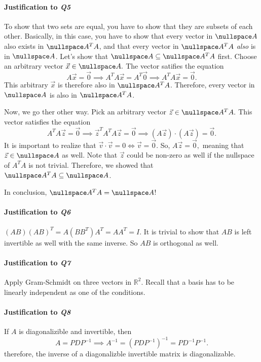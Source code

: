 	\paragraph{Justification to \textit{Q5}} To show that two sets are equal, you have to show that they are subsets of each other. Basically, in this case,
			you have to show that every vector in \(\nullspace A\) also exists in \(\nullspace A^TA\), and that every vector in \(\nullspace A^TA\) 
			\emph{also} is in \(\nullspace A\).
			Let's show that \(\nullspace A \subseteq \nullspace A^TA\) first. Choose an arbitrary vector \(\vec{x} \in \nullspace A.\) The vector satifies the
			equation
			\[A\vec{x} = \vec{0} \implies A^TA\vec{x} = A^T \vec{0} \implies A^TA\vec{x} = \vec{0}.\] This arbitrary \(\vec{x}\) is therefore also in
			\(\nullspace A^TA\). Therefore, every vector in \(\nullspace A\) is also in \(\nullspace A^TA\). 

			Now, we go ther other way. Pick an arbitrary vector \(\vec{z} \in \nullspace A^TA.\) This vector satisfies the equation
			\[A^TA \vec{z} = \vec{0} \implies \vec{z}^T A^TA \vec{z} = \vec{0} \implies (A\vec{z}) \cdot (A\vec{z}) = \vec{0}.\]
			It is important to realize that \(\vec{v} \cdot \vec{v} = 0 \iff \vec{v} = \vec{0}.\) So, \(A\vec{z} = \vec{0},\) meaning that 
			\(\vec{z} \in \nullspace A\) as well. Note that \(\vec{z}\) could be non-zero as well if the nullspace of \(A^TA\) is not trivial. Therefore, we
			showed that \(\nullspace A^TA \subseteq \nullspace A\).

			In conclusion, \(\nullspace A^TA = \nullspace A\)!

	\paragraph{Justification to \textit{Q6}} \((AB)(AB)^T = A(BB^T)A^T = AA^T = I.\) It is trivial to show that \(AB\) is left invertible as well with the same
			inverse. So \(AB\) is orthogonal as well.

	\paragraph{Justification to \textit{Q7}} Apply Gram-Schmidt on three vectors in \(\mathbb{R}^2.\) Recall that a basis has to be linearly independent as one
			of the conditions.

	\paragraph{Justification to \textit{Q8}} If \(A\) is diagonalizible and invertible, then \[A = PDP^{-1} \implies A^{-1} = (PDP^{-1})^{-1} = PD^{-1}P^{-1}.\]
			therefore, the inverse of a diagonalizble invertible matrix is diagonalizable.

